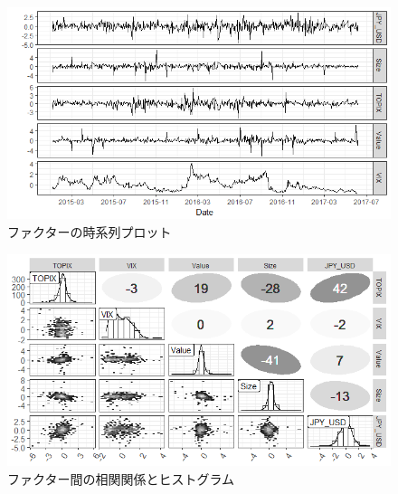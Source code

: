 ﻿\documentclass[11pt]{jreport}
\begin{document}
\begin{figure}[H]
	\begin{center}
		\includegraphics[width=15cm]{./fig/factor_plot.png}
		\caption{ファクターの時系列プロット}
		\label{fig:factor_plot}
	\end{center}
\end{figure}

\begin{figure}[H]
	\begin{center}
		\includegraphics[width=15cm]{./fig/factor_cor.png}
		\caption{ファクター間の相関関係とヒストグラム}
		\label{fig:factor_cor}
	\end{center}
\end{figure}
\end{document}
